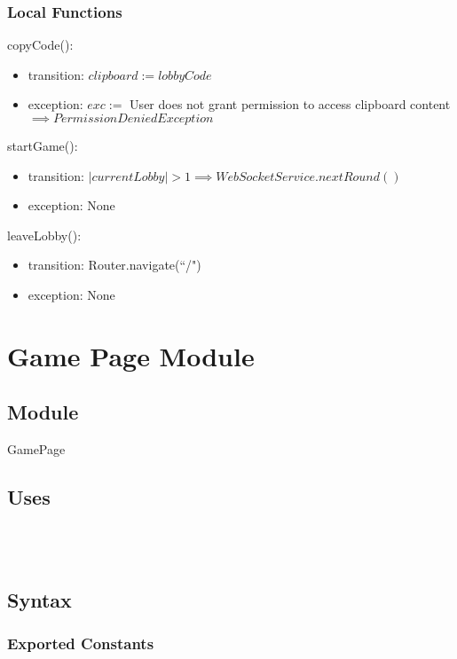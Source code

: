 \documentclass[12pt, titlepage]{article}
\begin{document}
\subsubsection{Local Functions}

\noindent copyCode():
\begin{itemize}
\item transition: $clipboard := lobbyCode$
\item exception: $exc := $ User does not grant permission to access clipboard content \\ $ \implies PermissionDeniedException$
\end{itemize}

\noindent startGame():
\begin{itemize}
\item transition: $|currentLobby| > 1 \implies WebSocketService.nextRound()$
\item exception: None
\end{itemize}

\noindent leaveLobby():
\begin{itemize}
\item transition: Router.navigate(``/")
\item exception: None
\end{itemize}

\newpage

\section{Game Page Module} \label{GamePage} 

\subsection{Module}

GamePage

\subsection{Uses}
\\
\\

\subsection{Syntax}

\subsubsection{Exported Constants}
\end{document}
